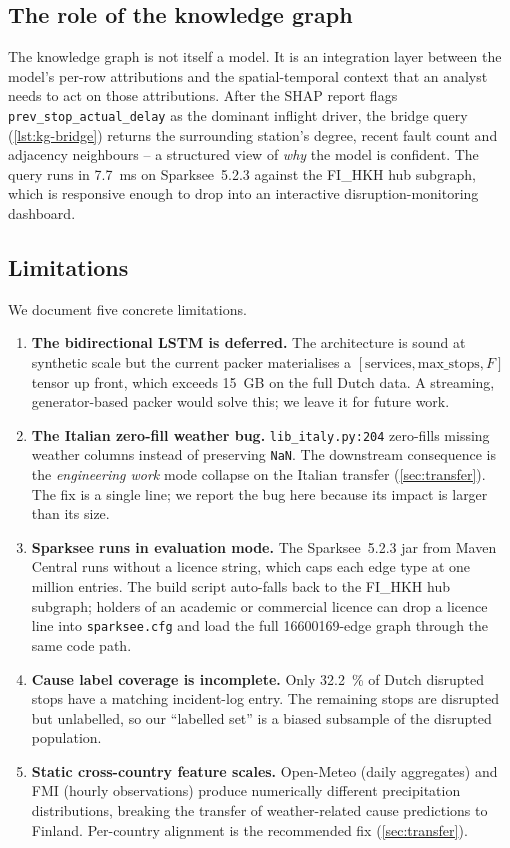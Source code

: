 \subsection{The role of the knowledge graph}

The knowledge graph is not itself a model. It is an integration layer between the model's per-row attributions and the spatial-temporal context that an analyst needs to act on those attributions. After the SHAP report flags \texttt{prev\_stop\_actual\_delay} as the dominant inflight driver, the bridge query (\cref{lst:kg-bridge}) returns the surrounding station's degree, recent fault count and adjacency neighbours -- a structured view of \emph{why} the model is confident. The query runs in \SI{7.7}{ms} on Sparksee~5.2.3 against the FI\_HKH hub subgraph, which is responsive enough to drop into an interactive disruption-monitoring dashboard.

\subsection{Limitations}

We document five concrete limitations.

\begin{enumerate}
    \item \textbf{The bidirectional LSTM is deferred.} The architecture is sound at synthetic scale but the current packer materialises a $[\text{services}, \text{max\_stops}, F]$ tensor up front, which exceeds \SI{15}{GB} on the full Dutch data. A streaming, generator-based packer would solve this; we leave it for future work.
    \item \textbf{The Italian zero-fill weather bug.} \texttt{lib\_italy.py:204} zero-fills missing weather columns instead of preserving \texttt{NaN}. The downstream consequence is the \emph{engineering work} mode collapse on the Italian transfer (\cref{sec:transfer}). The fix is a single line; we report the bug here because its impact is larger than its size.
    \item \textbf{Sparksee runs in evaluation mode.} The Sparksee~5.2.3 jar from Maven Central runs without a licence string, which caps each edge type at one million entries. The build script auto-falls back to the FI\_HKH hub subgraph; holders of an academic or commercial licence can drop a licence line into \texttt{sparksee.cfg} and load the full \num{16600169}-edge graph through the same code path.
    \item \textbf{Cause label coverage is incomplete.} Only \SI{32.2}{\percent} of Dutch disrupted stops have a matching incident-log entry. The remaining stops are disrupted but unlabelled, so our ``labelled set'' is a biased subsample of the disrupted population.
    \item \textbf{Static cross-country feature scales.} Open-Meteo (daily aggregates) and FMI (hourly observations) produce numerically different precipitation distributions, breaking the transfer of weather-related cause predictions to Finland. Per-country alignment is the recommended fix (\cref{sec:transfer}).
\end{enumerate}

